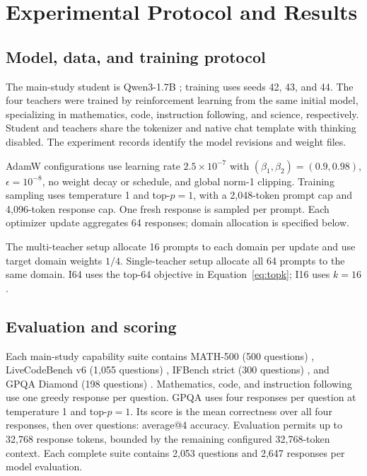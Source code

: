 \section{Experimental Protocol and Results}
\label{app:setup}

\subsection{Model, data, and training protocol}

The main-study student is Qwen3-1.7B \citep{qwen2025qwen3}; training uses seeds 42, 43, and 44. The four teachers were trained by reinforcement learning from the same initial model, specializing in mathematics, code, instruction following, and science, respectively. Student and teachers share the tokenizer and native chat template with thinking disabled. The experiment records identify the model revisions and weight files.

AdamW configurations use learning rate $2.5\times10^{-7}$ with $(\beta_1,\beta_2)=(0.9,0.98)$, $\epsilon=10^{-8}$, no weight decay or schedule, and global norm-1 clipping. Training sampling uses temperature 1 and top-$p=1$, with a 2,048-token prompt cap and 4,096-token response cap. One fresh response is sampled per prompt. Each optimizer update aggregates 64 responses; domain allocation is specified below.

The multi-teacher setup allocate 16 prompts to each domain per update and use target domain weights $1/4$. Single-teacher setup allocate all 64 prompts to the same domain. I64 uses the top-$64$ objective in Equation~\ref{eq:topk}; I16 uses $k=16$.


\subsection{Evaluation and scoring}

Each main-study capability suite contains MATH-500 (500 questions) \citep{hendrycks2021math}, LiveCodeBench v6 (1,055 questions) \citep{jain2024livecodebench}, IFBench strict (300 questions) \citep{pyatkin2025ifbench}, and GPQA Diamond (198 questions) \citep{rein2023gpqa}. Mathematics, code, and instruction following use one greedy response per question. GPQA uses four responses per question at temperature 1 and top-$p=1$. Its score is the mean correctness over all four responses, then over questions: average@4 accuracy. Evaluation permits up to 32,768 response tokens, bounded by the remaining configured 32,768-token context. Each complete suite contains 2,053 questions and 2,647 responses per model evaluation.

